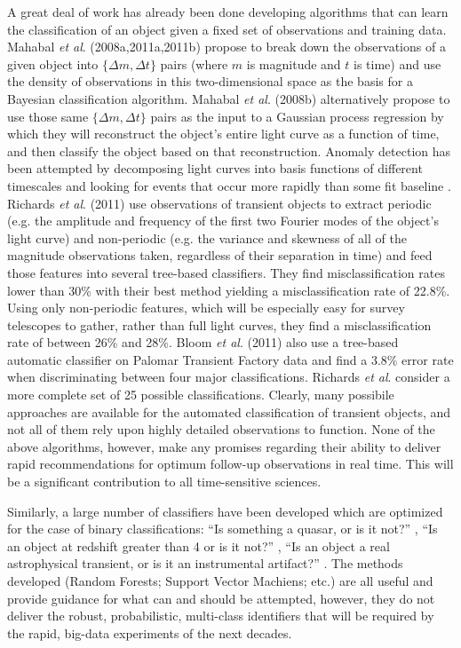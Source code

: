\documentclass[useAMS,usenatbib,tightenlines,11pt,preprint]{aastex}
\begin{document}
A great deal of work has
already been done developing algorithms that can learn the classification of an
object given a fixed set of observations and training data.  
Mahabal {\it et al}. (2008a,2011a,2011b) propose to break down the
observations of a given object into $\{\Delta m,\Delta t\}$ pairs (where $m$
is magnitude and $t$ is time) and use the density of observations in this 
two-dimensional space as the basis for a Bayesian classification algorithm.
Mahabal {\it et al}. (2008b) alternatively propose to use those same 
$\{\Delta m,\Delta t\}$ pairs as the input to a Gaussian process regression
by which they will reconstruct the object's entire light curve as a function
of time, and then classify the object based on that reconstruction.
Anomaly detection has been attempted by decomposing light curves into
basis functions of different timescales and looking for events that occur
more rapidly than some fit baseline \cite{preston2009,blocker2013}.
Richards {\it et al}. (2011) use observations of transient objects to extract
periodic (e.g. the amplitude and frequency of the first two Fourier modes of
the object's light curve) and non-periodic (e.g. the variance and skewness of
all of the magnitude observations taken, regardless of their separation in
time) and feed those features into several tree-based classifiers.
They find misclassification rates lower than 30\% with their best method yielding a
misclassification rate of 22.8\%.  Using only non-periodic features, which will be
especially easy for survey telescopes to gather, rather than
full light curves, they 
find a misclassification rate of
between 26\% and 28\%.
Bloom {\it et al}. (2011) also use a tree-based automatic classifier on
Palomar Transient Factory data and find a 3.8\% error rate when
discriminating between four major classifications.  Richards {\it et al}.
consider a more complete set of 25 possible classifications.
Clearly, many possibile approaches are available for the automated
classification of transient objects, and not all of them rely upon highly
detailed observations to function.  
None of the above algorithms, however, make
any promises regarding their ability to deliver rapid recommendations for
optimum follow-up observations in real time.  This will be a significant
contribution to all time-sensitive sciences.

Similarly, a large number of classifiers have been developed which are optimized
for the case of binary classifications: ``Is something a quasar, or is it not?''
\cite{kim2011,pichara2012}, ``Is an object at redshift greater than 4 or is it
not?'' \cite{morgan2011}, ``Is an object a real astrophysical transient, or is
it an instrumental artifact?'' \cite{brink2012}.  The methods developed
(Random Forests; Support Vector Machiens; etc.) are all useful
and provide guidance for what can and should be attempted, however, they do not
deliver the robust, probabilistic, multi-class identifiers that will be required
by the rapid, big-data experiments of the next decades.
\end{document}
